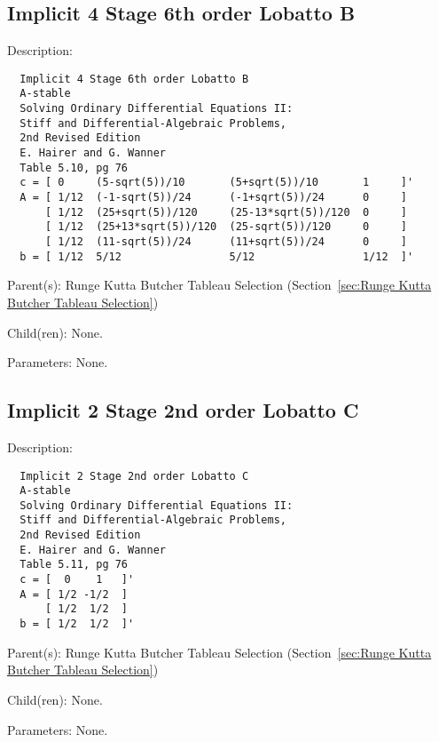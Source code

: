 \subsection{Implicit 4 Stage 6th order Lobatto B}
\label{sec:Implicit 4 Stage 6th order Lobatto B}

\begin{list}{}
  {\setlength{\leftmargin}{1.0in}
   \setlength{\labelwidth}{0.75in}
   \setlength{\labelsep}{0.125in}}
  \item[Description:]
\begin{verbatim}
  Implicit 4 Stage 6th order Lobatto B
  A-stable
  Solving Ordinary Differential Equations II:
  Stiff and Differential-Algebraic Problems,
  2nd Revised Edition
  E. Hairer and G. Wanner
  Table 5.10, pg 76
  c = [ 0     (5-sqrt(5))/10       (5+sqrt(5))/10       1     ]'
  A = [ 1/12  (-1-sqrt(5))/24      (-1+sqrt(5))/24      0     ]
      [ 1/12  (25+sqrt(5))/120     (25-13*sqrt(5))/120  0     ]
      [ 1/12  (25+13*sqrt(5))/120  (25-sqrt(5))/120     0     ]
      [ 1/12  (11-sqrt(5))/24      (11+sqrt(5))/24      0     ]
  b = [ 1/12  5/12                 5/12                 1/12  ]'
\end{verbatim}
  \item[Parent(s):]
    Runge Kutta Butcher Tableau Selection (Section~\ref{sec:Runge Kutta Butcher Tableau Selection})
  \item[Child(ren):]
    None. 
  \item[Parameters:]
    None. 
\end{list}

\subsection{Implicit 2 Stage 2nd order Lobatto C}
\label{sec:Implicit 2 Stage 2nd order Lobatto C}

\begin{list}{}
  {\setlength{\leftmargin}{1.0in}
   \setlength{\labelwidth}{0.75in}
   \setlength{\labelsep}{0.125in}}
  \item[Description:]
\begin{verbatim}
  Implicit 2 Stage 2nd order Lobatto C
  A-stable
  Solving Ordinary Differential Equations II:
  Stiff and Differential-Algebraic Problems,
  2nd Revised Edition
  E. Hairer and G. Wanner
  Table 5.11, pg 76
  c = [  0    1   ]'
  A = [ 1/2 -1/2  ]
      [ 1/2  1/2  ]
  b = [ 1/2  1/2  ]'
\end{verbatim}
  \item[Parent(s):]
    Runge Kutta Butcher Tableau Selection (Section~\ref{sec:Runge Kutta Butcher Tableau Selection})
  \item[Child(ren):]
    None. 
  \item[Parameters:]
    None. 
\end{list}

